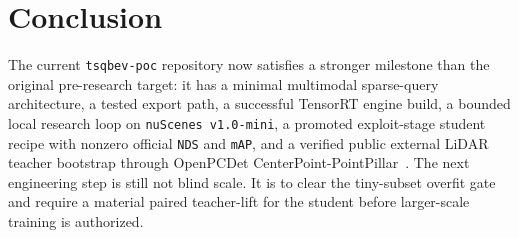 \documentclass[11pt]{article}
\begin{document}
\section{Conclusion}
The current \texttt{tsqbev-poc} repository now satisfies a stronger milestone than the original pre-research target: it has a minimal multimodal sparse-query architecture, a tested export path, a successful TensorRT engine build, a bounded local research loop on \texttt{nuScenes v1.0-mini}, a promoted exploit-stage student recipe with nonzero official \texttt{NDS} and \texttt{mAP}, and a verified public external LiDAR teacher bootstrap through OpenPCDet CenterPoint-PointPillar~\cite{centerpoint,opencpdet}. The next engineering step is still not blind scale. It is to clear the tiny-subset overfit gate and require a material paired teacher-lift for the student before larger-scale training is authorized.
\end{document}
